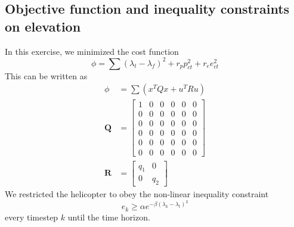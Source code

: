 \subsection{Objective function and inequality constraints on elevation}
In this exercise, we minimized the cost function
\begin{equation}
        \phi =\sum (\lambda_t - \lambda_f)^2 + r_{p}p_{ct}^2 + r_{e}e_{ct}^2
\end{equation}
This can be written as
\begin{subequations}
    \begin{align}
        \phi &= \sum(x^{T}Qx+u^{T}Ru) \\
        \mathbf{Q} &= \begin{bmatrix}
        1 & 0 & 0 & 0 & 0 & 0         \\
        0 & 0 & 0 & 0 & 0 & 0         \\
        0 & 0 & 0 & 0 & 0 & 0         \\
        0 & 0 & 0 & 0 & 0 & 0         \\
        0 & 0 & 0 & 0 & 0 & 0         \\
        0 & 0 & 0 & 0 & 0 & 0         
        \end{bmatrix}\\
        \mathbf{R} &= \begin{bmatrix}
            q_1        & 0        \\
            0          & q_2        
        \end{bmatrix}
    \end{align}
\end{subequations}
We restricted the helicopter to obey the non-linear inequality constraint
\begin{equation}
e_k \geq \alpha e^{-\beta(\lambda_k-\lambda_t)^{2}}
\end{equation}
every timestep $k$ until the time horizon.